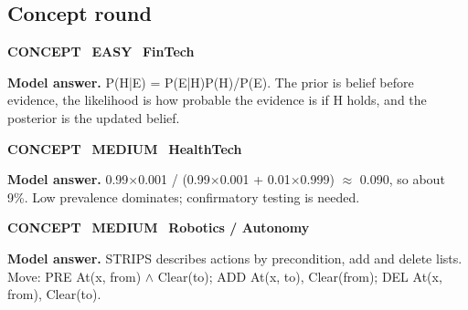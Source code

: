 \documentclass[11pt]{article}
\begin{document}
\subsection*{\color{teal}Concept round}
\begin{tcolorbox}[enhanced,breakable,colback=white,colframe=teal,arc=2mm,boxrule=0.8pt,left=3mm,right=3mm,
 title={\textbf{QIV.01}\quad State Bayes' theorem and explain prior, likelihood and posterior.},fonttitle=\color{white}\small,colbacktitle=teal]
\colorbox{teal!15}{\scriptsize\bfseries\color{teal} CONCEPT}\
\colorbox{leaf!15}{\scriptsize\bfseries\color{leaf} EASY}\
\colorbox{navy!8}{\scriptsize\bfseries\color{navy} FinTech}\par\smallskip
\textbf{\color{navy}Model answer.} P(H|E) = P(E|H)P(H)/P(E). The prior is belief before evidence, the likelihood is how probable the evidence is if H holds, and the posterior is the updated belief.
\end{tcolorbox}
\begin{tcolorbox}[enhanced,breakable,colback=white,colframe=teal,arc=2mm,boxrule=0.8pt,left=3mm,right=3mm,
 title={\textbf{QIV.02}\quad A test is 99\% sensitive with a 1\% false-positive rate; prevalence is 0.1\%. What is P(disease | +)?},fonttitle=\color{white}\small,colbacktitle=teal]
\colorbox{teal!15}{\scriptsize\bfseries\color{teal} CONCEPT}\
\colorbox{gold!85!black!15}{\scriptsize\bfseries\color{gold!85!black} MEDIUM}\
\colorbox{navy!8}{\scriptsize\bfseries\color{navy} HealthTech}\par\smallskip
\textbf{\color{navy}Model answer.} 0.99$\times$0.001 / (0.99$\times$0.001 + 0.01$\times$0.999) $\approx$ 0.090, so about 9\%. Low prevalence dominates; confirmatory testing is needed.
\end{tcolorbox}
\begin{tcolorbox}[enhanced,breakable,colback=white,colframe=teal,arc=2mm,boxrule=0.8pt,left=3mm,right=3mm,
 title={\textbf{QIV.03}\quad What is STRIPS? Write the Move(x, from, to) action for a robot.},fonttitle=\color{white}\small,colbacktitle=teal]
\colorbox{teal!15}{\scriptsize\bfseries\color{teal} CONCEPT}\
\colorbox{gold!85!black!15}{\scriptsize\bfseries\color{gold!85!black} MEDIUM}\
\colorbox{navy!8}{\scriptsize\bfseries\color{navy} Robotics / Autonomy}\par\smallskip
\textbf{\color{navy}Model answer.} STRIPS describes actions by precondition, add and delete lists. Move: PRE At(x, from) $\wedge$ Clear(to); ADD At(x, to), Clear(from); DEL At(x, from), Clear(to).
\end{tcolorbox}
\end{document}
